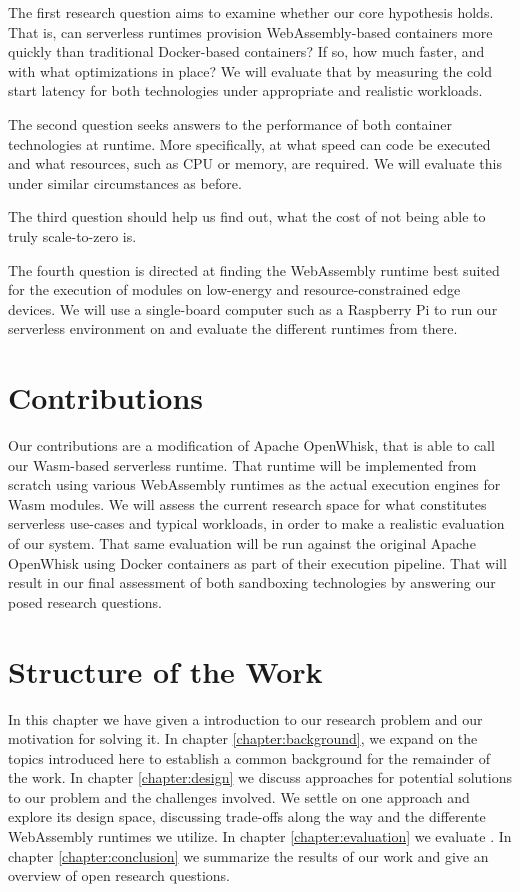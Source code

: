 The first research question aims to examine whether our core hypothesis holds. That is, can serverless runtimes provision WebAssembly-based containers more quickly than traditional Docker-based containers? If so, how much faster, and with what optimizations in place? We will evaluate that by measuring the cold start latency for both technologies under appropriate and realistic workloads.

The second question seeks answers to the performance of both container technologies at runtime. More specifically, at what speed can code be executed and what resources, such as CPU or memory, are required. We will evaluate this under similar circumstances as before.

The third question should help us find out, what the cost of not being able to truly scale-to-zero is.

The fourth question is directed at finding the WebAssembly runtime best suited for the execution of modules on low-energy and resource-constrained edge devices. We will use a single-board computer such as a Raspberry Pi to run our serverless environment on and evaluate the different runtimes from there.

\section{Contributions}

Our contributions are a modification of Apache OpenWhisk, that is able to call our Wasm-based serverless runtime. That runtime will be implemented from scratch using various WebAssembly runtimes as the actual execution engines for Wasm modules.
We will assess the current research space for what constitutes serverless use-cases and typical workloads, in order to make a realistic evaluation of our system. That same evaluation will be run against the original Apache OpenWhisk using Docker containers as part of their execution pipeline. That will result in our final assessment of both sandboxing technologies by answering our posed research questions.

\section{Structure of the Work}

In this chapter we have given a introduction to our research problem and our motivation for solving it. In chapter \ref{chapter:background}, we expand on the topics introduced here to establish a common background for the remainder of the work. In chapter \ref{chapter:design} we discuss approaches for potential solutions to our problem and the challenges involved. We settle on one approach and explore its design space, discussing trade-offs along the way and the differente WebAssembly runtimes we utilize. In chapter \ref{chapter:evaluation} we evaluate .
In chapter \ref{chapter:conclusion} we summarize the results of our work and give an overview of open research questions.
